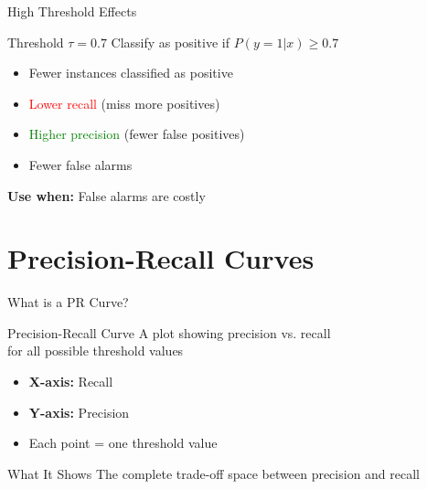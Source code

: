 \documentclass{beamer}
\begin{document}
\begin{frame}{High Threshold Effects}
\begin{block}{Threshold $\tau = 0.7$}
Classify as positive if $P(y=1|x) \geq 0.7$
\end{block}

\vspace{0.3cm}

\begin{itemize}
    \item Fewer instances classified as positive
    \item \textcolor{red}{Lower recall} (miss more positives)
    \item \textcolor{green}{Higher precision} (fewer false positives)
    \item Fewer false alarms
\end{itemize}

\vspace{0.3cm}

\begin{center}
\textbf{Use when:} False alarms are costly
\end{center}
\end{frame}

\section{Precision-Recall Curves}

\begin{frame}{What is a PR Curve?}
\begin{definitionbox}{Precision-Recall Curve}
A plot showing precision vs. recall \\
for all possible threshold values

\vspace{0.3cm}

\begin{itemize}
    \item \textbf{X-axis:} Recall
    \item \textbf{Y-axis:} Precision
    \item Each point = one threshold value
\end{itemize}
\end{definitionbox}

\vspace{0.3cm}

\begin{keypointsbox}{What It Shows}
The complete trade-off space between precision and recall
\end{keypointsbox}
\end{frame}
\end{document}
